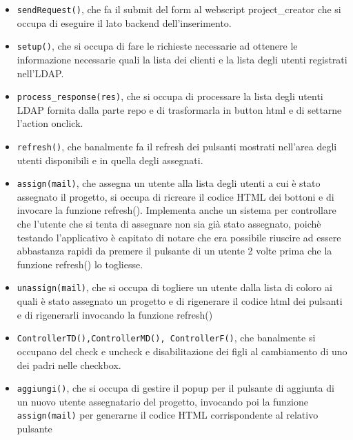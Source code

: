 \begin{itemize}
\item \texttt{sendRequest()}, che fa il submit del form al webscript project\_creator che si occupa di eseguire il lato backend dell’inserimento.
\item \texttt{setup()}, che si occupa di fare le richieste necessarie  ad ottenere le informazione necessarie quali la lista dei clienti e la lista degli utenti registrati nell’LDAP.
\item \texttt{process\_response(res)}, che si occupa di processare la lista degli utenti LDAP fornita dalla parte repo e di trasformarla in button html e di settarne l’action onclick.
\item \texttt{refresh()}, che banalmente fa il refresh dei pulsanti mostrati nell’area degli utenti disponibili e in quella degli assegnati.
\item \texttt{assign(mail)}, che assegna un utente alla lista degli utenti a cui è stato assegnato il progetto, si occupa di ricreare il codice HTML dei bottoni e di invocare la funzione refresh(). Implementa anche un sistema per controllare che l’utente che si tenta di assegnare non sia già stato assegnato, poichè testando l’applicativo è capitato di notare che era possibile riuscire ad essere abbastanza rapidi da premere il pulsante di un utente 2 volte prima che la funzione refresh() lo togliesse.
\item \texttt{unassign(mail)}, che si occupa di togliere un utente dalla lista di coloro ai quali è stato assegnato un progetto e di rigenerare il codice html dei pulsanti e di rigenerarli invocando la funzione refresh()
\item \texttt{ControllerTD(),ControllerMD(), ControllerF()}, che banalmente si occupano del check e uncheck e disabilitazione dei figli al cambiamento di uno dei padri nelle checkbox.
\item \texttt{aggiungi()}, che si occupa di gestire il popup per il pulsante di aggiunta di un nuovo utente assegnatario del progetto, invocando poi la funzione \texttt{assign(mail)} per generarne il codice HTML corrispondente al relativo pulsante
\end{itemize}

